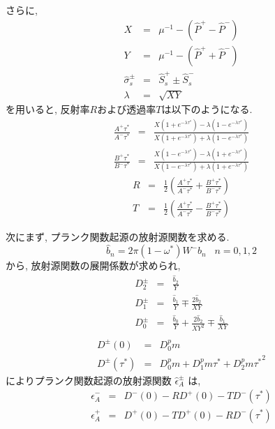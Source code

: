 さらに,
\begin{eqnarray}
  X & = & \mu^{-1} - (\hat{P}^+ - \hat{P}^- ) \\
  Y & = & \mu^{-1} - (\hat{P}^+ + \hat{P}^- ) \\
  \hat{\sigma}_s^{\pm} & = & \hat{S}_s^+ \pm \hat{S}_s^- \\
  \lambda & = & \sqrt{XY}
\end{eqnarray}
を用いると, 反射率$R$および透過率$T$は以下のようになる.
\begin{eqnarray}
 \frac{A^+{\tau^*}}{A^-{\tau^*}}
  & = & \frac{X (1+e^{-\lambda\tau^*}) - \lambda (1-e^{-\lambda\tau^*})}
             {X (1+e^{-\lambda\tau^*}) + \lambda (1-e^{-\lambda\tau^*})} \\
 \frac{B^+{\tau^*}}{B^-{\tau^*}}
  & = & \frac{X (1-e^{-\lambda\tau^*}) - \lambda (1+e^{-\lambda\tau^*})}
             {X (1-e^{-\lambda\tau^*}) + \lambda (1+e^{-\lambda\tau^*})}
\end{eqnarray}
\begin{eqnarray}
  R & = &  \frac{1}{2} \left(  \frac{A^+{\tau^*}}{A^-{\tau^*}} 
                             + \frac{B^+{\tau^*}}{B^-{\tau^*}} \right) \\
  T & = &  \frac{1}{2} \left(  \frac{A^+{\tau^*}}{A^-{\tau^*}} 
                             - \frac{B^+{\tau^*}}{B^-{\tau^*}} \right)
\end{eqnarray}

次にまず, プランク関数起源の放射源関数を求める.
\begin{equation}
  \hat{b}_n = 2 \pi (1-\omega^*) W^- b_n \; \; \; n=0,1,2 
\end{equation}
から, 放射源関数の展開係数が求められ,
\begin{eqnarray}
  D_2^\pm & = & \frac{\hat{b}_2}{Y} \\
  D_1^\pm & = & \frac{\hat{b}_1}{Y} \mp  \frac{2 \hat{b}_2}{XY} \\
  D_0^\pm & = & \frac{\hat{b}_0}{Y} + \frac{2 \hat{b}_2}{XY^2} 
                \mp  \frac{\hat{b}_1}{XY} \\
\end{eqnarray}
\begin{eqnarray}
  D^\pm(0)      & = & D_0^pm \\
  D^\pm(\tau^*) & = & D_0^pm + D_1^pm \tau^* + D_2^pm {\tau^*}^2
\end{eqnarray}
によりプランク関数起源の放射源関数 $\hat{\epsilon}_A^\pm$ は,
\begin{eqnarray}
  \hat{\epsilon}_A^- & = & D^-(0) - R D^+(0) - T D^-(\tau^*) \\
  \hat{\epsilon}_A^+ & = & D^+(0) - T D^+(0) - R D^-(\tau^*)
\end{eqnarray}

